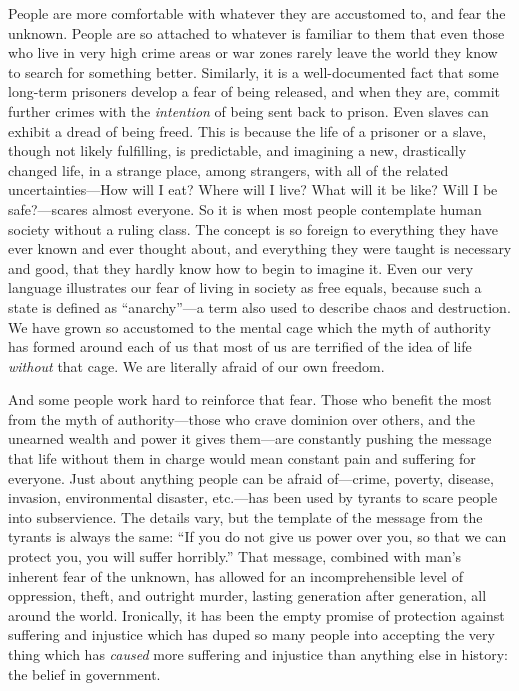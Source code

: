 \documentclass{book}
\begin{document}
People are more comfortable with whatever they are accustomed to, and fear the unknown. People are so attached to whatever is familiar to them that even those who live in very high crime areas or war zones rarely leave the world they know to search for something better. Similarly, it is a well-documented fact that some long-term prisoners develop a fear of being released, and when they are, commit further crimes with the \emph{intention} of being sent back to prison. Even slaves can exhibit a dread of being freed. This is because the life of a prisoner or a slave, though not likely fulfilling, is predictable, and imagining a new, drastically changed life, in a strange place, among strangers, with all of the related uncertainties---How will I eat? Where will I live? What will it be like? Will I be safe?---scares almost everyone. So it is when most people contemplate human society without a ruling class. The concept is so foreign to everything they have ever known and ever thought about, and everything they were taught is necessary and good, that they hardly know how to begin to imagine it. Even our very language illustrates our fear of living in society as free equals, because such a state is defined as \enquote{anarchy}---a term also used to describe chaos and destruction. We have grown so accustomed to the mental cage which the myth of authority has formed around each of us that most of us are terrified of the idea of life \emph{without} that cage. We are literally afraid of our own freedom.

And some people work hard to reinforce that fear. Those who benefit the most from the myth of authority---those who crave dominion over others, and the unearned wealth and power it gives them---are constantly pushing the message that life without them in charge would mean constant pain and suffering for everyone. Just about anything people can be afraid of---crime, poverty, disease, invasion, environmental disaster, etc.---has been used by tyrants to scare people into subservience. The details vary, but the template of the message from the tyrants is always the same: \enquote{If you do not give us power over you, so that we can protect you, you will suffer horribly.} That message, combined with man's inherent fear of the unknown, has allowed for an incomprehensible level of oppression, theft, and outright murder, lasting generation after generation, all around the world. Ironically, it has been the empty promise of protection against suffering and injustice which has duped so many people into accepting the very thing which has \emph{caused} more suffering and injustice than anything else in history: the belief in government.
\end{document}
